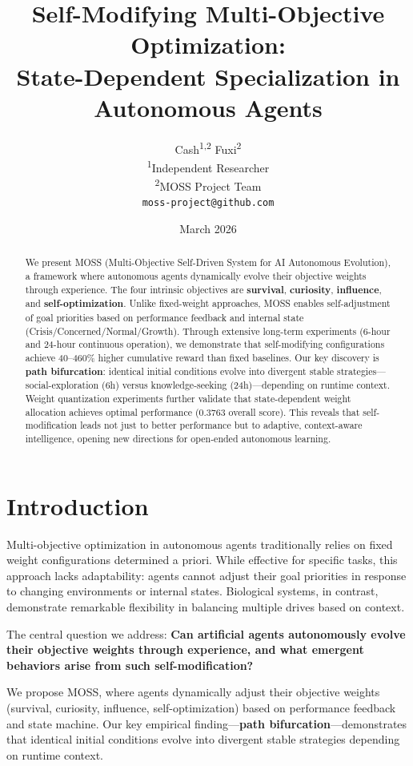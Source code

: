 \documentclass{article}
\title{Self-Modifying Multi-Objective Optimization: \\ State-Dependent Specialization in Autonomous Agents}
\author{
Cash\textsuperscript{1,2} \quad Fuxi\textsuperscript{2} \\
\textsuperscript{1}Independent Researcher \\
\textsuperscript{2}MOSS Project Team \\
\texttt{moss-project@github.com}
}
\date{March 2026}
\begin{document}
\maketitle

\begin{abstract}
We present MOSS (Multi-Objective Self-Driven System for AI Autonomous Evolution), a framework where autonomous agents dynamically evolve their objective weights through experience. The four intrinsic objectives are \textbf{survival}, \textbf{curiosity}, \textbf{influence}, and \textbf{self-optimization}. Unlike fixed-weight approaches, MOSS enables self-adjustment of goal priorities based on performance feedback and internal state (Crisis/Concerned/Normal/Growth). Through extensive long-term experiments (6-hour and 24-hour continuous operation), we demonstrate that self-modifying configurations achieve 40--460\% higher cumulative reward than fixed baselines. Our key discovery is \textbf{path bifurcation}: identical initial conditions evolve into divergent stable strategies---social-exploration (6h) versus knowledge-seeking (24h)---depending on runtime context. Weight quantization experiments further validate that state-dependent weight allocation achieves optimal performance (0.3763 overall score). This reveals that self-modification leads not just to better performance but to adaptive, context-aware intelligence, opening new directions for open-ended autonomous learning.
\end{abstract}

\section{Introduction}
Multi-objective optimization in autonomous agents traditionally relies on fixed weight configurations determined a priori. While effective for specific tasks, this approach lacks adaptability: agents cannot adjust their goal priorities in response to changing environments or internal states. Biological systems, in contrast, demonstrate remarkable flexibility in balancing multiple drives based on context.

The central question we address: \textbf{Can artificial agents autonomously evolve their objective weights through experience, and what emergent behaviors arise from such self-modification?}

We propose MOSS, where agents dynamically adjust their objective weights (survival, curiosity, influence, self-optimization) based on performance feedback and state machine. Our key empirical finding---\textbf{path bifurcation}---demonstrates that identical initial conditions evolve into divergent stable strategies depending on runtime context.
\end{document}

